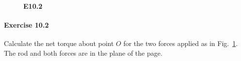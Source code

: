 \documentclass[11pt]{article}
\newenvironment{problem}
{
    \ignorespaces
}
\renewcommand{\vec}[1]{\mathbf{#1}}
\begin{document}
\begin{figure}
	\vspace{1in}
	\caption{\textbf{E10.2}}
	\label{E10.2}
\end{figure}

\paragraph{Exercise 10.2}
\begin{problem}
	Calculate the net torque about point $O$ for the two forces applied as in Fig.~\ref{E10.2}.  The rod and both forces are in the plane of the page.
\end{problem}

	

\newcommand{\ih}{}
\newcommand{\jh}{\vec{\,\hat{j}}}
\newcommand{\kh}{\vec{\,\hat{k}}}

\newcommand{\vF}{\vec{F}}
\newcommand{\vt}{\boldsymbol{\tau}}
\newcommand{\vr}{\vec{r}}

\newcommand{\vFq}{\vF_1}
\newcommand{\Fq}{F_1}
\newcommand{\vFw}{\vF_2}
\newcommand{\Fw}{F_2}

\newcommand{\vtq}{\vt_1}
\newcommand{\vtw}{\vt_2}
\newcommand{\vrq}{\vr_1}
\newcommand{\rrq}{r_1}
\newcommand{\vrw}{\vr_2}
\newcommand{\rw}{r_2}

\newcommand{\vtnet}{\vt_\text{net}}
\newcommand{\tnet}{\tau_\text{net}}
\end{document}
